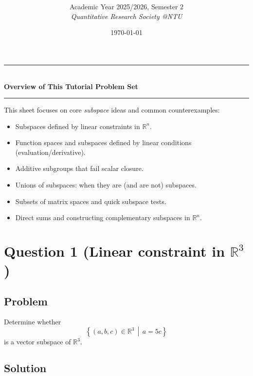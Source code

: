 \documentclass[12pt]{article}
\title{
\CourseCode\ \CourseName \\[0.3em]
\large \DocType
}
\author{
  Academic Year 2025/2026, Semester 2 \\[0.25em]
  \textit{Quantitative Research Society @NTU}
}
\date{\today}
\begin{document}
\maketitle
\thispagestyle{plainfirst}
\pagestyle{main}
\bigskip

\begin{center}
  \rule{0.8\textwidth}{0.4pt}\\[4pt]
  \textbf{Overview of This Tutorial Problem Set}\\[2pt]
  \rule{0.8\textwidth}{0.4pt}
\end{center}

\noindent
This sheet focuses on core \emph{subspace} ideas and common counterexamples:
\begin{itemize}[leftmargin=*]
  \item Subspaces defined by linear constraints in \(\mathbb{R}^n\).
  \item Function spaces and subspaces defined by linear conditions (evaluation/derivative).
  \item Additive subgroups that fail scalar closure.
  \item Unions of subspaces: when they are (and are not) subspaces.
  \item Subsets of matrix spaces and quick subspace tests.
  \item Direct sums and constructing complementary subspaces in \(\mathbb{R}^n\).
\end{itemize}

\bigskip
\newpage
\tableofcontents
\newpage
\section{Question 1 (Linear constraint in \(\mathbb{R}^3\))}
\subsection{Problem}
Determine whether
\[
\left\{(a,b,c)\in \mathbb{R}^3 \,\middle|\, a=5c\right\}
\]
is a vector subspace of \(\mathbb{R}^3\).

\subsection{Solution}
\end{document}

